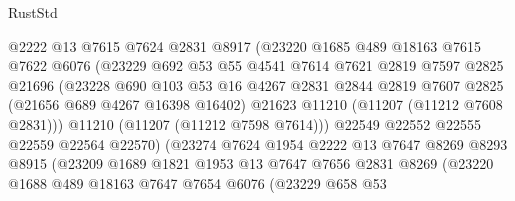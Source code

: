 \begin{lexlean}{RustStd}
\begin{coremodule}
                        @2222
                        @13
                        @7615
                        @7624
                        @2831
                        @8917
                        (@23220
                          @1685
                          @489
                          @18163
                          @7615
                          @7622
                          @6076
                          (@23229
                            @692
                            @53
                            @55
                            @4541
                            @7614
                            @7621
                            @2819
                            @7597
                            @2825
                            @21696
                            (@23228
                              @690
                              @103
                              @53
                              @16
                              @4267
                              @2831
                              @2844
                              @2819
                              @7607
                              @2825
                              (@21656 @689 @4267 @16398 @16402)
                              @21623
                              @11210
                              (@11207 (@11212 @7608 @2831)))
                            @11210
                            (@11207 (@11212 @7598 @7614)))
                          @22549
                          @22552
                          @22555
                          @22559
                          @22564
                          @22570)
                        (@23274
                          @7624
                          @1954
                          @2222
                          @13
                          @7647
                          @8269
                          @8293
                          @8915
                          (@23209
                            @1689
                            @1821
                            @1953
                            @13
                            @7647
                            @7656
                            @2831
                            @8269
                            (@23220
                              @1688
                              @489
                              @18163
                              @7647
                              @7654
                              @6076
                              (@23229
                                @658
                                @53

\end{coremodule}
\end{lexlean}
